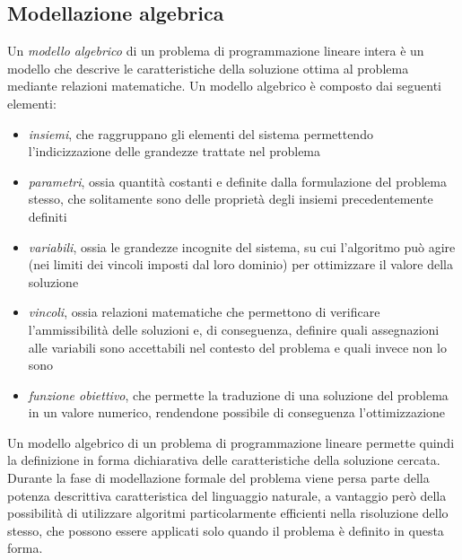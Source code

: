 \subsection{Modellazione algebrica}
Un \textit{modello algebrico} di un problema di programmazione lineare intera è un modello che descrive le caratteristiche della soluzione ottima al problema mediante relazioni matematiche. Un modello algebrico è composto dai seguenti elementi:
\begin{itemize}
\item \textsl{insiemi}, che raggruppano gli elementi del sistema permettendo l'indicizzazione delle grandezze trattate nel problema
\item \textsl{parametri}, ossia quantità costanti e definite dalla formulazione del problema stesso, che solitamente sono delle proprietà degli insiemi precedentemente definiti
\item \textsl{variabili}, ossia le grandezze incognite del sistema, su cui l'algoritmo può agire (nei limiti dei vincoli imposti dal loro dominio) per ottimizzare il valore della soluzione
\item \textsl{vincoli}, ossia relazioni matematiche che permettono di verificare l'ammissibilità delle soluzioni e, di conseguenza, definire quali assegnazioni alle variabili sono accettabili nel contesto del problema e quali invece non lo sono
\item \textsl{funzione obiettivo}, che permette la traduzione di una soluzione del problema in un valore numerico, rendendone possibile di conseguenza l'ottimizzazione
\end{itemize}

Un modello algebrico di un problema di programmazione lineare permette quindi la definizione in forma dichiarativa delle caratteristiche della soluzione cercata. Durante la fase di modellazione formale del problema viene persa parte della potenza descrittiva caratteristica del linguaggio naturale, a vantaggio però della possibilità di utilizzare algoritmi particolarmente efficienti nella risoluzione dello stesso, che possono essere applicati solo quando il problema è definito in questa forma.

